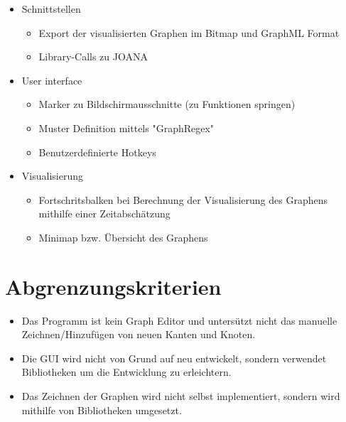 \begin{itemize}
\item Schnittstellen
\begin{itemize}
\item Export der visualisierten Graphen im Bitmap und GraphML Format
\item Library-Calls zu JOANA
\end{itemize}
\item User interface
\begin{itemize}
\item Marker zu Bildschirmausschnitte (zu Funktionen springen)
\item Muster Definition mittels "GraphRegex"
\item Benutzerdefinierte Hotkeys
\end{itemize}
\item Visualisierung
\begin{itemize}
\item Fortschritsbalken bei Berechnung der Visualisierung des Graphens mithilfe einer Zeitabschätzung
\item Minimap bzw. Übersicht des Graphens
\end{itemize}
\end{itemize}

\section{Abgrenzungskriterien}

\begin{itemize}
\item Das Programm ist kein Graph Editor und untersützt nicht das manuelle Zeichnen/Hinzufügen von neuen Kanten und Knoten.
\item Die GUI wird nicht von Grund auf neu entwickelt, sondern verwendet Bibliotheken um die Entwicklung zu erleichtern. 
\item Das Zeichnen der Graphen wird nicht selbst implementiert, sondern wird mithilfe von Bibliotheken umgesetzt.
\end{itemize}